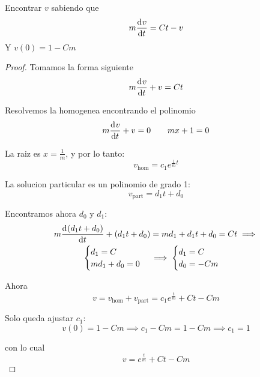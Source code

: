 \documentclass[a4paper]{article}
\newcommand{\dv}[3][]{\frac{\dif^{#1} #2}{\dif #3^{#1}}}
\begin{document}
\begin{example}
  Encontrar $v$ sabiendo que
  \[
    m \dv{v}{t} = C t - v
  \]
  Y $v(0) = 1 - Cm$
\end{example}
\begin{proof}
  Tomamos la forma siguiente
  \[
    m \dv{v}{t} + v = C t
  \]

  Resolvemos la homogenea encontrando el polinomio
  \[
    m \dv{v}{t} + v = 0 \qquad m x + 1 = 0
  \]

  La raiz es $x = \frac{1}{m}$, y por lo tanto:
  \[
    v_{\text{hom}} = c_1 e^{\frac{1}{m} t}
  \]

  La solucion particular es un polinomio de grado 1:
  \[
    v_{\text{part}} = d_1 t + d_0
  \]

  Encontramos ahora $d_0$ y $d_1$:
  \[
    \begin{gathered}
      m \dv{\left( d_1 t + d_0 \right)}{t} + \left( d_1 t + d_0  \right) =
      m d_1 + d_1 t + d_0 = C t
      \implies \\
      \begin{cases}
	d_1 = C \\
	m d_1 + d_0 = 0
      \end{cases}
      \implies
      \begin{cases}
	d_1 = C \\
	d_0 = -Cm
      \end{cases}
    \end{gathered}
  \]

  Ahora
  \[
    v = v_{\text{hom}} + v_{\text{part}} = c_1 e^{\frac{t}{m}} + C t - Cm
  \]

  Solo queda ajustar $c_1$:
  \[
    v(0) = 1 - Cm \implies c_1 - Cm = 1 - Cm \implies c_1 = 1
  \]

  con lo cual
  \[
    v = e^{\frac{t}{m}} + Ct - Cm
  \]
\end{proof}
\end{document}
